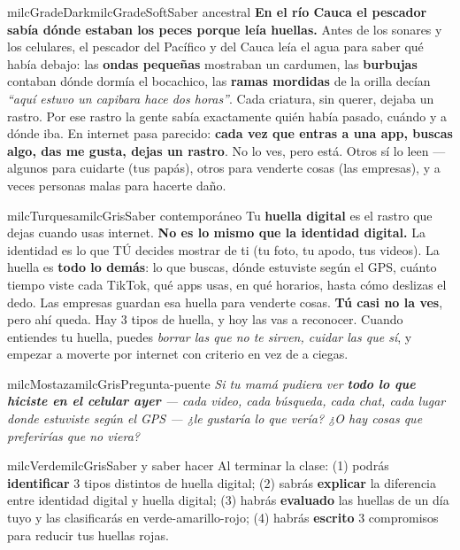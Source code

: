 \documentclass[11pt,letterpaper]{article}
\begin{document}
\begin{softbox}{milcGradeDark}{milcGradeSoft}{Saber ancestral}
\textbf{En el río Cauca el pescador sabía dónde estaban los peces porque leía huellas.} Antes de los sonares y los celulares, el pescador del Pacífico y del Cauca leía el agua para saber qué había debajo: las \textbf{ondas pequeñas} mostraban un cardumen, las \textbf{burbujas} contaban dónde dormía el bocachico, las \textbf{ramas mordidas} de la orilla decían \emph{``aquí estuvo un capibara hace dos horas''}. Cada criatura, sin querer, dejaba un rastro. Por ese rastro la gente sabía exactamente quién había pasado, cuándo y a dónde iba. En internet pasa parecido: \textbf{cada vez que entras a una app, buscas algo, das me gusta, dejas un rastro}. No lo ves, pero está. Otros sí lo leen --- algunos para cuidarte (tus papás), otros para venderte cosas (las empresas), y a veces personas malas para hacerte daño.
\end{softbox}

\begin{softbox}{milcTurquesa}{milcGris}{Saber contemporáneo}
Tu \textbf{huella digital} es el rastro que dejas cuando usas internet. \textbf{No es lo mismo que la identidad digital.} La identidad es lo que TÚ decides mostrar de ti (tu foto, tu apodo, tus videos). La huella es \textbf{todo lo demás}: lo que buscas, dónde estuviste según el GPS, cuánto tiempo viste cada TikTok, qué apps usas, en qué horarios, hasta cómo deslizas el dedo. Las empresas guardan esa huella para venderte cosas. \textbf{Tú casi no la ves}, pero ahí queda. Hay 3 tipos de huella, y hoy las vas a reconocer. Cuando entiendes tu huella, puedes \emph{borrar las que no te sirven, cuidar las que sí}, y empezar a moverte por internet con criterio en vez de a ciegas.
\end{softbox}

\begin{softbox}{milcMostaza}{milcGris}{Pregunta-puente}
\textit{Si tu mamá pudiera ver \textbf{todo lo que hiciste en el celular ayer} --- cada video, cada búsqueda, cada chat, cada lugar donde estuviste según el GPS --- ¿le gustaría lo que vería? ¿O hay cosas que preferirías que no viera?}
\end{softbox}

\begin{softbox}{milcVerde}{milcGris}{Saber y saber hacer}
Al terminar la clase: (1) podrás \textbf{identificar} 3 tipos distintos de huella digital; (2) sabrás \textbf{explicar} la diferencia entre identidad digital y huella digital; (3) habrás \textbf{evaluado} las huellas de un día tuyo y las clasificarás en verde-amarillo-rojo; (4) habrás \textbf{escrito} 3 compromisos para reducir tus huellas rojas.
\end{softbox}
\end{document}

